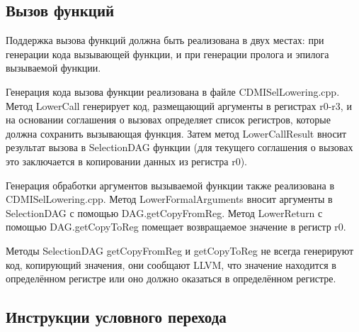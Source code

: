 \documentclass[a4paper,14pt]{extarticle}
\begin{document}
\subsection{Вызов функций}

Поддержка вызова функций должна быть реализована в двух местах: при генерации кода вызывающей функции, и при генерации пролога и эпилога вызываемой функции.

Генерация кода вызова функции реализована в файле CDMISelLowering.cpp. Метод LowerCall генерирует код, размещающий аргументы в регистрах r0-r3, и на основании соглашения о вызовах определяет список регистров, которые должна сохранить вызывающая функция. Затем метод LowerCallResult вносит результат вызова в SelectionDAG функции (для текущего соглашения о вызовах это заключается в копировании данных из регистра r0).

Генерация обработки аргументов вызываемой функции также реализована в CDMISelLowering.cpp. Метод LowerFormalArguments вносит аргументы в SelectionDAG с помощью DAG.getCopyFromReg. Метод LowerReturn с помощью DAG.getCopyToReg помещает возвращаемое значение в регистр r0.

Методы SelectionDAG getCopyFromReg и getCopyToReg не всегда генерируют код, копирующий значения, они сообщают LLVM, что значение находится в определённом регистре или оно должно оказаться в определённом регистре.


\subsection{Инструкции условного перехода}
\end{document}
